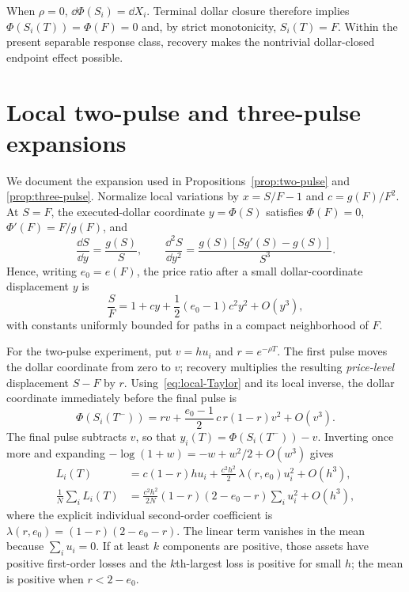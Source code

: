 \documentclass[review,hidelinks,onefignum,onetabnum]{siamonline250211}
\begin{document}
When $\rho=0$, $\dd\Phi(S_i)=\dd X_i$. Terminal dollar closure therefore implies $\Phi(S_i(T))=\Phi(F)=0$ and, by strict monotonicity, $S_i(T)=F$. Within the present separable response class, recovery makes the nontrivial dollar-closed endpoint effect possible.

\section{Local two-pulse and three-pulse expansions}\label{app:local}
We document the expansion used in Propositions~\ref{prop:two-pulse} and \ref{prop:three-pulse}. Normalize local variations by $x=S/F-1$ and $c=g(F)/F^2$. At $S=F$, the executed-dollar coordinate $y=\Phi(S)$ satisfies $\Phi(F)=0$, $\Phi'(F)=F/g(F)$, and
\begin{equation}\label{eq:local-inverse}
\frac{\dd S}{\dd y}=\frac{g(S)}S,
\qquad
\frac{\dd^2 S}{\dd y^2}=
\frac{g(S)[Sg'(S)-g(S)]}{S^3}.
\end{equation}
Hence, writing $e_0=e(F)$, the price ratio after a small dollar-coordinate displacement $y$ is
\begin{equation}\label{eq:local-Taylor}
\frac SF=1+cy+\frac12(e_0-1)c^2y^2+O(y^3),
\end{equation}
with constants uniformly bounded for paths in a compact neighborhood of $F$.

For the two-pulse experiment, put $v=hu_i$ and
$r=e^{-\rho T}$. The first pulse moves the dollar coordinate
from zero to $v$; recovery multiplies the resulting
\emph{price-level} displacement $S-F$ by $r$.
Using~\eqref{eq:local-Taylor} and its local inverse,
the dollar coordinate immediately before the final pulse is
\[
\Phi(S_i(T^-))
=rv+\frac{e_0-1}{2}\,c\,r(1-r)v^2+O(v^3).
\]
The final pulse subtracts $v$, so that
$y_i(T)=\Phi(S_i(T^-))-v$.
Inverting once more and expanding
$-\log(1+w)=-w+w^2/2+O(w^3)$ gives
\begin{align}\label{eq:local-two}
L_i(T)&=c(1-r)hu_i+\frac{c^2h^2}{2}\,\lambda(r,e_0)u_i^2+O(h^3),\\
\frac1N\sum_i L_i(T)&=\frac{c^2h^2}{2N}(1-r)(2-e_0-r)\sum_i u_i^2+O(h^3),\nonumber
\end{align}
where the explicit individual second-order coefficient is
$\lambda(r,e_0)=(1-r)(2-e_0-r)$.
The linear term vanishes in the mean because $\sum_i u_i=0$.
If at least $k$ components are positive, those assets have
positive first-order losses and the $k$th-largest loss is positive
for small $h$; the mean is positive when $r<2-e_0$.
\end{document}
